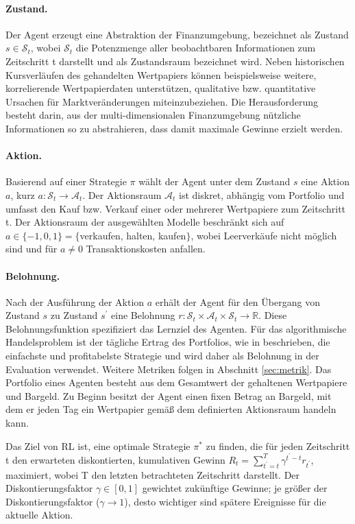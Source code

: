 \paragraph*{Zustand.}
\label{par:zustand}
Der Agent erzeugt eine Abstraktion der Finanzumgebung, bezeichnet als Zustand $s\in\mathcal{S}_t$, wobei $\mathcal{S}_t$ die Potenzmenge aller beobachtbaren Informationen zum Zeitschritt t darstellt und als Zustandsraum bezeichnet wird. 
Neben historischen Kursverläufen des gehandelten Wertpapiers können beispielsweise weitere, korrelierende Wertpapierdaten unterstützen, qualitative bzw. quantitative Ursachen für Marktveränderungen miteinzubeziehen.
Die Herausforderung besteht darin, aus der multi-dimensionalen Finanzumgebung nützliche Informationen so zu abstrahieren, dass damit maximale Gewinne erzielt werden.
\paragraph*{Aktion.}
\label{par:action}
Basierend auf einer Strategie $\pi$ wählt der Agent unter dem Zustand $s$ eine Aktion $a$, kurz $a:\mathcal{S}_t\to\mathcal{A}_t$. Der Aktionsraum $\mathcal{A}_t$ ist diskret, abhängig vom Portfolio und umfasst den Kauf bzw. Verkauf einer oder mehrerer Wertpapiere zum Zeitschritt t.
Der Aktionsraum der ausgewählten Modelle beschränkt sich auf $a\in\{-1, 0, 1\}=\{$verkaufen, halten, kaufen$\}$, wobei Leerverkäufe nicht möglich sind und für $a\neq0$ Transaktionskosten anfallen. 
\paragraph*{Belohnung.}
\label{par:belohnung}
Nach der Ausführung der Aktion $a$ erhält der Agent für den Übergang von Zustand $s$ zu Zustand $s^\prime$ eine Belohnung 
$r:\mathcal{S}_t\times\mathcal{A}_t\times\mathcal{S}_t\to\mathbb{R}$.
Diese Belohnungsfunktion spezifiziert das Lernziel des Agenten. Für das algorithmische Handelsproblem ist der tägliche Ertrag des Portfolios, wie in \parencite{zhang2019deep,théate2020application} beschrieben, die einfachste und profitabelste Strategie und wird daher als Belohnung in der Evaluation verwendet.
Weitere Metriken folgen in Abschnitt \ref{sec:metrik}.
Das Portfolio eines Agenten besteht aus dem Gesamtwert der gehaltenen Wertpapiere und Bargeld. 
Zu Beginn besitzt der Agent einen fixen Betrag an Bargeld, mit dem er jeden Tag ein Wertpapier gemäß dem definierten Aktionsraum handeln kann.

Das Ziel von \acs{RL} ist, eine optimale Strategie $\pi^\ast$ zu finden, die für jeden Zeitschritt t den erwarteten diskontierten, kumulativen Gewinn $R_t = \sum_{t^\prime=t}^T \gamma^{t^\prime-t} r_{t^\prime}$, maximiert, wobei T den letzten betrachteten Zeitschritt darstellt. Der Diskontierungsfaktor $\gamma\in[0,1]$ gewichtet zukünftige Gewinne; je größer der Diskontierungsfaktor ($\gamma\to1$), desto wichtiger sind spätere Ereignisse für die aktuelle Aktion.

